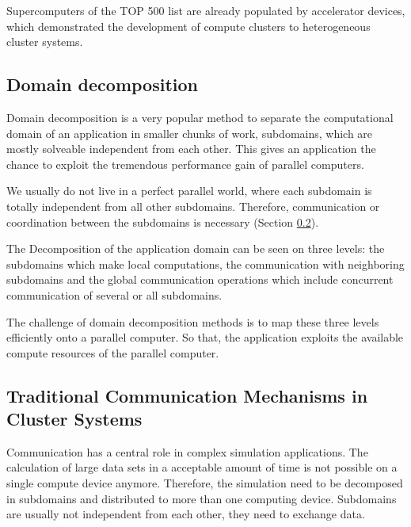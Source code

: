 Supercomputers of the TOP 500 list \cite{ref:top500} are already
populated by accelerator devices, which demonstrated the development
of compute clusters to heterogeneous cluster systems.


\subsection{Domain decomposition}
\label{sec:domain_decomposition}
Domain decomposition is a very popular method to separate the
computational domain of an application in smaller chunks of work,
subdomains, which are mostly solveable independent from each
other. This gives an application the chance to exploit the tremendous
performance gain of parallel computers.

We usually do not live in a perfect parallel world, where each
subdomain is totally independent from all other subdomains.
Therefore, communication or coordination between the subdomains is
necessary (Section \ref{sec:communication}).

The Decomposition of the application domain can be seen on three
levels: the subdomains which make local computations, the
communication with neighboring subdomains and the global communication
operations which include concurrent communication of several or all
subdomains.

The challenge of domain decomposition methods is to map these three
levels efficiently onto a parallel computer. So that, the application
exploits the available compute resources of the parallel computer.


\subsection{Traditional Communication Mechanisms in Cluster Systems}
\label{sec:communication}
Communication has a central role in complex simulation
applications. The calculation of large data sets in a acceptable amount
of time is not possible on a single compute device anymore.
Therefore, the simulation need to be decomposed in subdomains and
distributed to more than one computing device. Subdomains are usually not
independent from each other, they need to exchange data.

